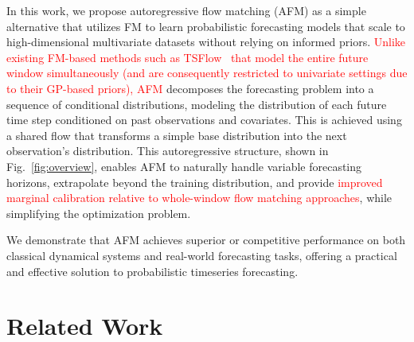\documentclass[a4paper,10pt,twocolumn,preprint,3p]{elsarticle}
\begin{document}
In this work, we propose autoregressive flow matching (AFM) as a simple alternative that utilizes FM to learn probabilistic forecasting models that scale to high-dimensional multivariate datasets without relying on informed priors. \textcolor{red}{Unlike existing FM-based methods such as TSFlow~\citep{Kerrigan2024Flow} that model the entire future window simultaneously (and are consequently restricted to univariate settings due to their GP-based priors),} %
\textcolor{red}{AFM} decomposes the forecasting problem into a sequence of conditional distributions, modeling the distribution of each future time step conditioned on past observations and covariates. This is achieved using a shared flow that transforms a simple base distribution into the next observation’s distribution. This autoregressive structure, shown in Fig.~\ref{fig:overview}, enables AFM to naturally handle variable forecasting horizons, extrapolate beyond the training distribution, and provide \textcolor{red}{improved marginal calibration relative to whole-window flow matching approaches}, while simplifying the optimization problem. 

We demonstrate that AFM achieves superior or competitive performance on both classical dynamical systems and real-world forecasting tasks, offering a practical and effective solution to probabilistic timeseries forecasting.



{\color{red}\section{Related Work}}
\label{sec:related_work}
\end{document}
